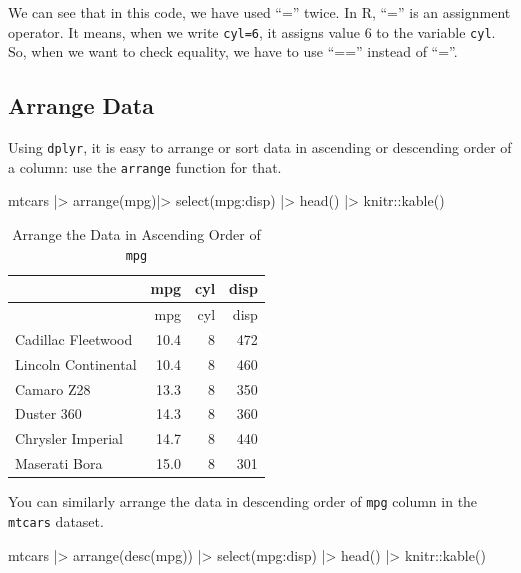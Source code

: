 \documentclass[
  letterpaper,
  paper =a4,
  twoside,
  openright,
  headsepline,
  footsepline,
  listof = totocnumbered,
  chapterprefix = true,
  firstiscover,
  parskip = full*]{scrbook}
\newenvironment{Shaded}{\begin{snugshade}}{\end{snugshade}}
\newcommand{\FunctionTok}[1]{\textcolor[rgb]{0.28,0.35,0.67}{#1}}
\newcommand{\NormalTok}[1]{\textcolor[rgb]{0.00,0.23,0.31}{#1}}
\newcommand{\SpecialCharTok}[1]{\textcolor[rgb]{0.37,0.37,0.37}{#1}}
\begin{document}
We can see that in this code, we have used ``='' twice. In R, ``='' is
an assignment operator. It means, when we write \texttt{cyl=6}, it
assigns value 6 to the variable \texttt{cyl}. So, when we want to check
equality, we have to use ``=='' instead of ``=''.

\subsection{Arrange Data}\label{arrange-data}

Using \texttt{dplyr}, it is easy to arrange or sort data in ascending or
descending order of a column: use the \texttt{arrange} function for
that.

\begin{Shaded}
\begin{Highlighting}[]
\NormalTok{mtcars }\SpecialCharTok{|\textgreater{}} \FunctionTok{arrange}\NormalTok{(mpg)}\SpecialCharTok{|\textgreater{}} \FunctionTok{select}\NormalTok{(mpg}\SpecialCharTok{:}\NormalTok{disp) }\SpecialCharTok{|\textgreater{}} \FunctionTok{head}\NormalTok{() }\SpecialCharTok{|\textgreater{}}\NormalTok{ knitr}\SpecialCharTok{::}\FunctionTok{kable}\NormalTok{()}
\end{Highlighting}
\end{Shaded}

\begin{longtable}[]{@{}lrrr@{}}
\caption{Arrange the Data in Ascending Order of
\texttt{mpg}}\tabularnewline
\toprule\noalign{}
& mpg & cyl & disp \\
\midrule\noalign{}
\endfirsthead
\toprule\noalign{}
& mpg & cyl & disp \\
\midrule\noalign{}
\endhead
\bottomrule\noalign{}
\endlastfoot
Cadillac Fleetwood & 10.4 & 8 & 472 \\
Lincoln Continental & 10.4 & 8 & 460 \\
Camaro Z28 & 13.3 & 8 & 350 \\
Duster 360 & 14.3 & 8 & 360 \\
Chrysler Imperial & 14.7 & 8 & 440 \\
Maserati Bora & 15.0 & 8 & 301 \\
\end{longtable}

You can similarly arrange the data in descending order of \texttt{mpg}
column in the \texttt{mtcars} dataset.

\begin{Shaded}
\begin{Highlighting}[]
\NormalTok{mtcars }\SpecialCharTok{|\textgreater{}} \FunctionTok{arrange}\NormalTok{(}\FunctionTok{desc}\NormalTok{(mpg)) }\SpecialCharTok{|\textgreater{}} \FunctionTok{select}\NormalTok{(mpg}\SpecialCharTok{:}\NormalTok{disp) }\SpecialCharTok{|\textgreater{}} \FunctionTok{head}\NormalTok{() }\SpecialCharTok{|\textgreater{}}\NormalTok{ knitr}\SpecialCharTok{::}\FunctionTok{kable}\NormalTok{()}
\end{Highlighting}
\end{Shaded}
\end{document}
